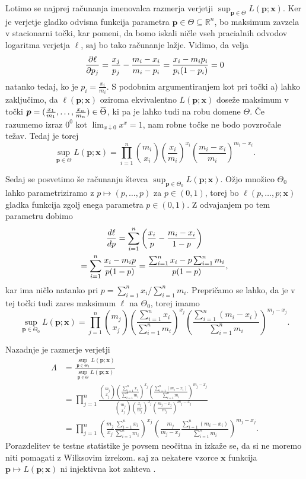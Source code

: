 \documentclass[a4paper,11pt]{article}
\newcommand{\ols}[1]{\mskip.5\thinmuskip\overline{\mskip-.5\thinmuskip {#1} \mskip-.5\thinmuskip}\mskip.5\thinmuskip} %
\newcommand{\sumin}{\sum_{i = 1}^n}
\newcommand{\R}{\mathbb{R}}
\begin{document}
Lotimo se najprej računanja imenovalca razmerja verjetji $\sup_{\bm{p} \in \Theta} L(\bm{p}; \bm{x})$. Ker je verjetje gladko odvisna funkcija parametra $\bm{p} \in \Theta \subseteq \R^n$, bo maksimum zavzela v stacionarni točki, kar pomeni, da bomo iskali ničle vseh pracialnih odvodov logaritma verjetja $\ell$, saj bo tako računanje lažje. Vidimo, da velja
\[
    \pdv{\ell}{p_j} (\bm{p}; \bm{x}) = 
    \frac{x_j}{p_j} - \frac{m_i - x_i}{m_i - p_i} = 
    \frac{x_i - m_i p_i}{p_i(1 - p_i)} = 0
\] 
natanko tedaj, ko je $p_i = \frac{x_i}{m_i}$. S podobnim argumentiranjem kot pri točki a) lahko zaključimo, da $\ell(\bm{p}; \bm{x})$ oziroma ekvivalentno $L(\bm{p}; \bm{x})$ doseže maksimum v točki $\bm{p} = (\frac{x_1}{m_1}, \dots, \frac{x_n}{m_n}) \in \ols\Theta$, ki pa je lahko tudi na robu domene $\Theta$. Če razumemo izraz $0^0$ kot $\lim_{x \downarrow 0}x^x = 1$, nam robne točke ne bodo povzročale težav. Tedaj je torej 
\[
    \sup_{\bm{p} \in \Theta} L(\bm{p}; \bm{x}) = 
    \prod_{i = 1}^n \binom{m_i}{x_i} \left(\frac{x_i}{m_i}\right)^{x_i} \left(\frac{m_i - x_i}{m_i}\right)^{m_i - x_i}.
\]

Sedaj se posvetimo še računanju števca $\sup_{\bm{p} \in \Theta_0} L(\bm{p}; \bm{x})$. Ožjo množico $\Theta_0$ lahko parametriziramo z $p \mapsto (p,\dots, p)$ za $p \in (0,1)$, torej bo $\ell(p, \dots, p; \bm{x})$ gladka funkcija zgolj enega parametra $p \in (0,1)$. Z odvajanjem po tem parametru dobimo 
\begin{multline*}
    \derivative{\ell}{p} (p, \dots, p; \bm{x}) = 
    \sumin \left(\frac{x_i}{p} - \frac{m_i - x_i}{1 - p}\right) \\ = 
    \sumin \frac{x_i - m_i p}{p(1-p)} = 
    \frac{\sumin x_i - p \sumin m_i}{p(1-p)},
\end{multline*}
kar ima ničlo natanko pri $p = \sumin x_i / \sumin m_i$. Prepričamo se lahko, da je v tej točki tudi zares maksimum $\ell$ na $\Theta_0$, torej imamo
\[
    \sup_{\bm{p} \in \Theta_0} L(\bm{p}; \bm{x}) = 
    \prod_{j = 1}^n \binom{m_j}{x_j} \left(\frac{\sumin x_i}{\sumin m_i}\right)^{x_j} \left(\frac{\sumin(m_i - x_i)}{\sumin m_i}\right)^{m_j - x_j}.
\]

Nazadnje je razmerje verjetji
\begin{align*}
    \Lambda &= 
    \frac{\sup_{\bm{p} \in \Theta_0} L(\bm{p}; \bm{x})}{\sup_{\bm{p} \in \Theta} L(\bm{p}; \bm{x})}  \\ 
    &= \prod_{j = 1}^n
    \frac{\binom{m_j}{x_j} \left(\frac{\sumin x_i}{\sumin m_i}\right)^{x_j} \left(\frac{\sumin(m_i - x_i)}{\sumin m_i}\right)^{m_j - x_j}}{\binom{m_j}{x_j} \left(\frac{x_j}{m_j}\right)^{x_j} \left(\frac{m_j - x_j}{m_j}\right)^{m_j - x_j}} \\ &= 
    \prod_{j = 1}^n
    \left(\frac{m_j}{x_j} \frac{\sumin x_i}{\sumin m_i}\right)^{x_j}
    \left(\frac{m_j}{m_j - x_j}\frac{\sumin(m_i - x_i)}{\sumin m_i}\right)^{m_j - x_j}.
\end{align*}
Porazdelitev te testne statistike je povsem neočitna in izkaže se, da si ne moremo niti pomagati z Wilksovim izrekom. saj za nekatere vzorce $\bm{x}$ funkcija $\bm{p}\mapsto L(\bm{p}; \bm{x})$ ni injektivna kot zahteva \cite[Theorem 1]{Ginestet}.
\end{document}
